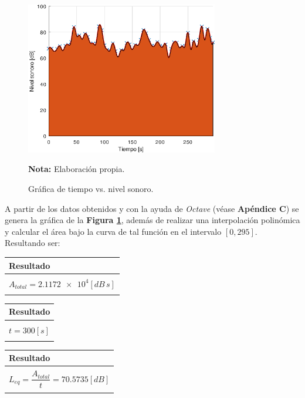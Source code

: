 \documentclass[letter,11pt]{article}
\newcommand{\source}[1]{\vspace{-11pt} \caption*{\small{\textbf{Nota:} {#1}}}}
\begin{document}
\begin{figure}
\centering
\includegraphics[width=0.75\textwidth]{resources/o1.eps}
\caption{Gráfica de tiempo vs. nivel sonoro.}
\label{figura6}
\source{Elaboración propia.}
\end{figure}

A partir de los datos obtenidos y con la ayuda de \emph{Octave} (véase
\textbf{Apéndice C}) se genera la gráfica de la \textbf{Figura \ref{figura6}},
además de realizar una interpolación polinómica y calcular el área bajo la
curva de tal función en el intervalo $[0,295]$. Resultando ser:

\begin{center}
\begin{tabular}{|>{\centering}m{9.2cm}<{\centering}|}
\hline
\textbf{Resultado} 
\tabularnewline \hline
\\
$A_{total} = \num{2.1172e4} [dB\,s]$ \tabularnewline
\\
\hline
\end{tabular}
\end{center}
\vspace{0.10cm}

\begin{center}
\begin{tabular}{|>{\centering}m{9.2cm}<{\centering}|}
\hline
\textbf{Resultado} 
\tabularnewline \hline
\\
$t = 300 [s]$ \tabularnewline
\\
\hline
\end{tabular}
\end{center}
\vspace{0.10cm}

\begin{center}
\begin{tabular}{|>{\centering}m{9.2cm}<{\centering}|}
\hline
\textbf{Resultado} 
\tabularnewline \hline
\\
$L_{eq} = \dfrac{A_{total}}{t} = 70.5735 [dB]$ \tabularnewline
\\
\hline
\end{tabular}
\end{center}
\vspace{0.10cm}
\end{document}
